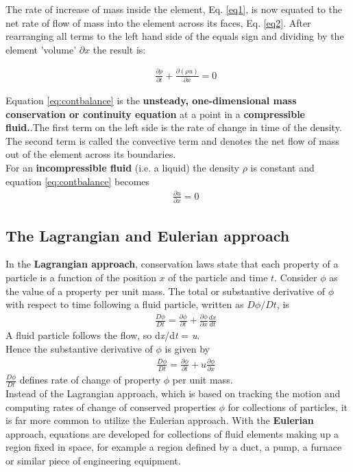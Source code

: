 The rate of increase of mass inside the element, Eq. \ref{eq1}, is now equated to the net rate of flow of mass into the element across its faces, Eq. \ref{eq2}. After rearranging all terms to the left hand side of the equals sign and dividing by the element 'volume' $\partial x$ the result is:

\begin{align}
	&& \frac{\partial \rho}{\partial t} + \frac{\partial (\rho u)}{\partial x} =0 
	\label{eq:contbalance}
\end{align}  

Equation \ref{eq:contbalance} is the \textbf{unsteady, one-dimensional mass conservation or continuity equation} at a point in a \textbf{compressible fluid.}.The first term on the left side is the rate of change in time of the density. The second term is called the convective term and  denotes the net flow of mass out of the element across its boundaries. \\
For an \textbf{incompressible fluid} (i.e. a liquid) the density $\rho$ is constant and equation \ref{eq:contbalance} becomes 
\begin{align}
&&	\frac{\partial u}{\partial x} = 0
\end{align}

\newpage
\subsection{The Lagrangian and Eulerian approach}
In the \textbf{Lagrangian approach}, conservation laws state that each property of a particle is a function of the position $x$ of the particle and time $t$. Consider $\phi$ as the value of a property per unit mass. The total or substantive derivative of $\phi$ with respect to time following a fluid particle, written as $D\phi / Dt$, is
\begin{align}
&&	\frac{D \phi}{Dt} = \frac{\partial \phi}{\partial t} + \frac{\partial \phi}{\partial x} \frac{dx}{dt}
\end{align}
A fluid particle follows the flow, so d\textit{x}/d\textit{t} = \textit{u}.\\ 
Hence the substantive derivative of $\phi$ is given by\begin{align}
&&\frac{D \phi}{Dt} = \frac{\partial \phi}{\partial t} + u\frac{\partial \phi}{\partial x} 
\end{align}
$\frac{D \phi}{D t}$ defines rate of change of property $\phi$ per unit mass. \\
Instead of the Lagrangian approach, which is based on tracking the motion and computing rates of change of conserved properties $\phi$ for collections of particles, it is far more common to utilize the Eulerian approach. With the \textbf{Eulerian} approach, equations are developed for collections of fluid elements making up a region fixed in space, for example a region defined by a duct, a pump, a furnace or similar piece of engineering equipment. 
\\ 

